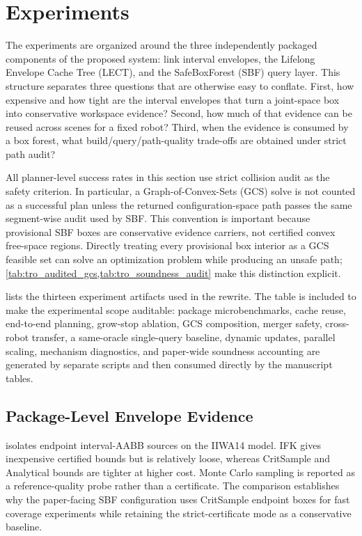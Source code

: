 \section{Experiments}\label{sec:exp}

The experiments are organized around the three independently packaged components of the proposed system: link interval envelopes, the Lifelong Envelope Cache Tree (LECT), and the SafeBoxForest (SBF) query layer. This structure separates three questions that are otherwise easy to conflate. First, how expensive and how tight are the interval envelopes that turn a joint-space box into conservative workspace evidence? Second, how much of that evidence can be reused across scenes for a fixed robot? Third, when the evidence is consumed by a box forest, what build/query/path-quality trade-offs are obtained under strict path audit?

All planner-level success rates in this section use strict collision audit as the safety criterion. In particular, a Graph-of-Convex-Sets (GCS) solve is not counted as a successful plan unless the returned configuration-space path passes the same segment-wise audit used by SBF. This convention is important because provisional SBF boxes are conservative evidence carriers, not certified convex free-space regions. Directly treating every provisional box interior as a GCS feasible set can solve an optimization problem while producing an unsafe path; \cref{tab:tro_audited_gcs,tab:tro_soundness_audit} make this distinction explicit.

 lists the thirteen experiment artifacts used in the rewrite. The table is included to make the experimental scope auditable: package microbenchmarks, cache reuse, end-to-end planning, grow-stop ablation, GCS composition, merger safety, cross-robot transfer, a same-oracle single-query baseline, dynamic updates, parallel scaling, mechanism diagnostics, and paper-wide soundness accounting are generated by separate scripts and then consumed directly by the manuscript tables.



\subsection{Package-Level Envelope Evidence}\label{sec:exp_envelopes}

 isolates endpoint interval-AABB sources on the IIWA14 model. IFK gives inexpensive certified bounds but is relatively loose, whereas CritSample and Analytical bounds are tighter at higher cost. Monte Carlo sampling is reported as a reference-quality probe rather than a certificate. The comparison establishes why the paper-facing SBF configuration uses CritSample endpoint boxes for fast coverage experiments while retaining the strict-certificate mode as a conservative baseline.

